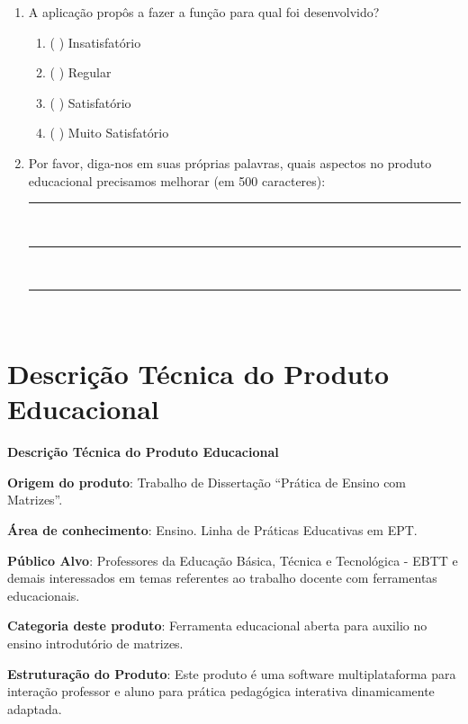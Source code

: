 \begin{apendicesenv}
\begin{enumerate}
    \item A aplicação propôs a fazer a função para qual foi desenvolvido?
    \begin{enumerate}
        \item ( ) Insatisfatório
        \item ( ) Regular
        \item ( ) Satisfatório
        \item ( ) Muito Satisfatório
    \end{enumerate}
    

   \item Por favor, diga-nos em suas próprias palavras, quais aspectos no produto educacional precisamos melhorar (em 500 caracteres):\hrulefill \\
    \rule{15cm}{.1pt}\\
    \rule{15cm}{.1pt}\\
    \rule{15cm}{.1pt}\\




    
\end{enumerate}





\chapter{Descrição Técnica do Produto Educacional}

\begin{center}
    \textbf{ Descrição Técnica do Produto Educacional}
\end{center}

\begin{flushleft}


\textbf{Origem do produto}: Trabalho de Dissertação “Prática de Ensino com Matrizes”.

\textbf{Área de conhecimento}: Ensino. Linha de Práticas Educativas em EPT.

\textbf{Público Alvo}: Professores da Educação Básica, Técnica e Tecnológica - EBTT e demais interessados em temas referentes ao trabalho docente com ferramentas educacionais.

\textbf{Categoria deste produto}: Ferramenta educacional aberta para auxilio no ensino introdutório de matrizes.

\textbf{Estruturação do Produto}: Este produto é uma software multiplataforma para interação professor e aluno para prática pedagógica interativa dinamicamente adaptada.


\end{flushleft}
\end{apendicesenv}
